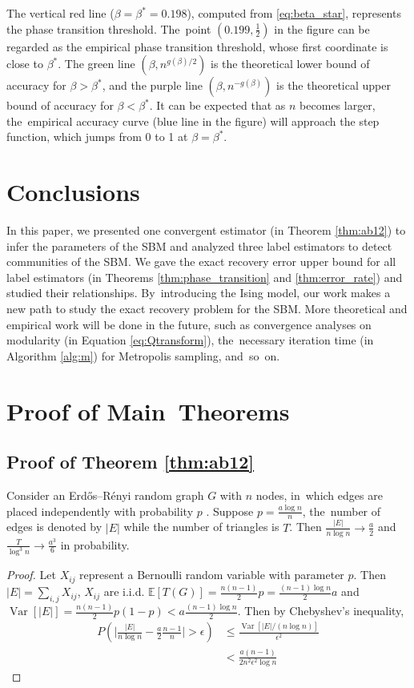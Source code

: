 \documentclass[entropy,article,accept,moreauthors,pdftex]{Definitions/mdpi}
\newcommand{\A}{\frac{a \log n}{n}}
\newcommand{\1}{\mathbbm{1}}
\DeclareMathOperator{\Var}{Var}
\begin{document}
\begin{paracol}{2}
\switchcolumn


The vertical red line ($\beta=\beta^* = 0.198$), computed from \eqref{eq:beta_star}, represents the phase transition threshold. The~point $(0.199,\frac{1}{2})$ in the figure
can be regarded as the empirical phase transition threshold, whose first coordinate is close to $\beta^*$.
The green line $(\beta, n^{g(\beta)/2})$ is the theoretical lower bound of accuracy for $\beta>\beta^*$, and the purple line
$(\beta, n^{-g(\beta)})$ is the theoretical upper bound of accuracy for $\beta < \beta^*$. It can be expected that
as $n$ becomes larger, the~empirical accuracy curve (blue line in the figure) will approach the step function, which jumps from
0 to 1 at $\beta=\beta^*$.
\section{Conclusions}
In this paper, we presented  one convergent estimator (in Theorem \ref{thm:ab12}) to infer the parameters of the SBM and analyzed three label estimators to detect communities of the SBM.
We gave the exact recovery error upper bound for all label estimators (in Theorems \ref{thm:phase_transition} and \ref{thm:error_rate})
and studied their relationships. By~introducing the Ising model, our work makes a new path to study the exact recovery problem for the SBM. More
theoretical and empirical work will be done in the future, such as convergence analyses on modularity (in Equation \eqref{eq:Qtransform}), the~necessary iteration time (in Algorithm \ref{alg:m}) for Metropolis sampling, and~so~on.

\section{Proof of Main~Theorems}\label{sec:pm}
\subsection{Proof of Theorem \ref{thm:ab12}}
\begin{Lemma}\label{lem:ER_tr_counting}
	Consider an Erdős–Rényi random graph $G$ with $n$ nodes, in~which edges are placed independently with probability $p$ \cite{erdHos1960evolution}. Suppose
	$p=\A$, the~number of edges is denoted by $|E|$ while the number of triangles is $T$. Then
	$\frac{|E|}{n \log n} \to \frac{a}{2}$ and $\frac{T}{\log^3 n} \to \frac{a^3}{6}$ in probability.
\end{Lemma}
\begin{proof}
		Let $X_{ij}$ represent a Bernoulli random variable with parameter $p$. Then $|E| = \sum_{i,j} X_{ij}$, $X_{ij}$ are i.i.d.
	$\mathbb{E}[T(G)] = \frac{n(n-1)}{2}p = \frac{(n-1)\log n}{2}a$ and $\Var[|E|] = \frac{n(n-1)}{2} p(1-p) < a\frac{(n-1)\log n}{2}$.
	Then by Chebyshev's inequality,
	\begin{align*}
	P(\Big|\frac{|E|}{n \log n } - \frac{a}{2} \frac{n-1}{n}\Big| > \epsilon) & \leq
	\frac{\Var[|E| /(n \log n )]}{\epsilon^2} \\
	& < \frac{a(n-1)}{2n^2\epsilon^2\log n}
	\end{align*}
	

\end{proof}
\end{paracol}
\end{document}
